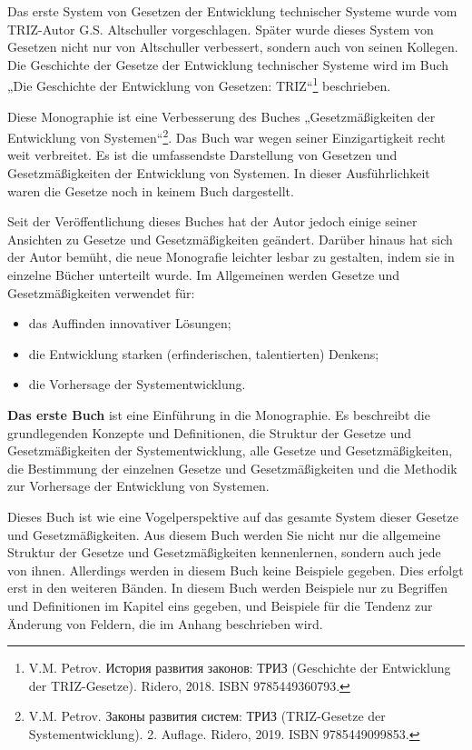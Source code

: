 \documentclass[11pt,a4paper]{article}
\begin{document}
Das erste System von Gesetzen der Entwicklung technischer Systeme wurde vom
TRIZ-Autor G.S. Altschuller vorgeschlagen. Später wurde dieses System von
Gesetzen nicht nur von Altschuller verbessert, sondern auch von seinen
Kollegen. Die Geschichte der Gesetze der Entwicklung technischer Systeme wird
im Buch „Die Geschichte der Entwicklung von Gesetzen:
TRIZ“\footnote{V.M. Petrov. \foreignlanguage{russian}{История развития
    законов: ТРИЗ} (Geschichte der Entwicklung der TRIZ-Gesetze).  Ridero,
  2018. ISBN 9785449360793.} beschrieben.

Diese Monographie ist eine Verbesserung des Buches „Gesetzmäßigkeiten der
Entwicklung von Systemen“\footnote{V.M. Petrov.
  \foreignlanguage{russian}{Законы развития систем: ТРИЗ} (TRIZ-Gesetze der
  Systementwicklung). 2. Auflage. Ridero, 2019.  ISBN 9785449099853.}.  Das
Buch war wegen seiner Einzigartigkeit recht weit verbreitet. Es ist die
umfassendste Darstellung von Gesetzen und Gesetzmäßigkeiten der Entwicklung
von Systemen. In dieser Ausführlichkeit waren die Gesetze noch in keinem Buch
dargestellt.

Seit der Veröffentlichung dieses Buches hat der Autor jedoch einige seiner
Ansichten zu Gesetze und Gesetzmäßigkeiten geändert. Darüber hinaus hat sich
der Autor bemüht, die neue Monografie leichter lesbar zu gestalten, indem sie
in einzelne Bücher unterteilt wurde.
\newpage
Im Allgemeinen werden Gesetze und Gesetzmäßigkeiten verwendet für:
\begin{itemize}[noitemsep]
  \item das Auffinden innovativer Lösungen;
  \item die Entwicklung starken (erfinderischen, talentierten) Denkens;
  \item die Vorhersage der Systementwicklung.
\end{itemize}
\textbf{Das erste Buch} ist eine Einführung in die Monographie. Es beschreibt
die grundlegenden Konzepte und Definitionen, die Struktur der Gesetze und
Gesetzmäßigkeiten der Systementwicklung, alle Gesetze und Gesetzmäßigkeiten,
die Bestimmung der einzelnen Gesetze und Gesetzmäßigkeiten und die Methodik
zur Vorhersage der Entwicklung von Systemen.

Dieses Buch ist wie eine Vogelperspektive auf das gesamte System dieser
Gesetze und Gesetzmäßigkeiten. Aus diesem Buch werden Sie nicht nur die
allgemeine Struktur der Gesetze und Gesetzmäßigkeiten kennenlernen, sondern
auch jede von ihnen. Allerdings werden in diesem Buch keine Beispiele gegeben.
Dies erfolgt erst in den weiteren Bänden. In diesem Buch werden Beispiele nur
zu Begriffen und Definitionen im Kapitel eins gegeben, und Beispiele für die
Tendenz zur Änderung von Feldern, die im Anhang beschrieben wird.
\end{document}
